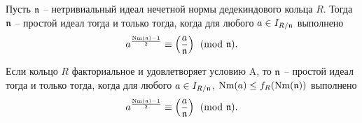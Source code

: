 \documentclass[_00_dissertation.tex]{subfiles}
\begin{document}
\begin{theorem}\label{theorem:euler_criteria}
    Пусть $\mathfrak{n}$ -- нетривиальный идеал нечетной нормы дедекиндового кольца $R$.
    Тогда $\mathfrak{n}$ -- простой идеал тогда и только тогда, когда для любого $a \in I_{R/\mathfrak{n}}$ выполнено
    \begin{equation*}
        a^{\frac{\textrm{Nm}(\mathfrak{n}) - 1}{2}} \equiv \left(\frac{a}{\mathfrak{n}}\right) \pmod{\mathfrak{n}}.
    \end{equation*}

    Если кольцо $R$ факториальное и удовлетворяет условию A, то $\mathfrak{n}$ -- простой идеал тогда и только тогда, когда для любого $a \in I_{R/\mathfrak{n}}$, $\textrm{Nm}(a) \le f_R(\textrm{Nm}(\mathfrak{n}))$ выполнено
    \begin{equation*}
        a^{\frac{\textrm{Nm}(\mathfrak{n}) - 1}{2}} \equiv \left(\frac{a}{\mathfrak{n}}\right) \pmod{\mathfrak{n}}.
    \end{equation*}
\end{theorem}
\end{document}
